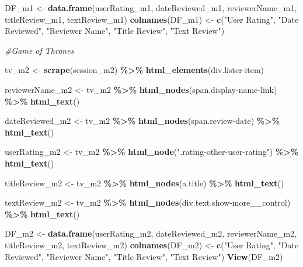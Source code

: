 \documentclass[
]{article}
\newenvironment{Shaded}{\begin{snugshade}}{\end{snugshade}}
\newcommand{\CommentTok}[1]{\textcolor[rgb]{0.56,0.35,0.01}{\textit{#1}}}
\newcommand{\FunctionTok}[1]{\textcolor[rgb]{0.13,0.29,0.53}{\textbf{#1}}}
\newcommand{\NormalTok}[1]{#1}
\newcommand{\OtherTok}[1]{\textcolor[rgb]{0.56,0.35,0.01}{#1}}
\newcommand{\SpecialCharTok}[1]{\textcolor[rgb]{0.81,0.36,0.00}{\textbf{#1}}}
\newcommand{\StringTok}[1]{\textcolor[rgb]{0.31,0.60,0.02}{#1}}
\begin{document}
\begin{Shaded}
\begin{Highlighting}[]
\NormalTok{DF\_m1 }\OtherTok{\textless{}{-}} \FunctionTok{data.frame}\NormalTok{(userRating\_m1, dateReviewed\_m1, reviewerName\_m1, titleReview\_m1, textReview\_m1)}
\FunctionTok{colnames}\NormalTok{(DF\_m1) }\OtherTok{\textless{}{-}} \FunctionTok{c}\NormalTok{(}\StringTok{"User Rating"}\NormalTok{, }\StringTok{"Date Reviewed"}\NormalTok{, }\StringTok{"Reviewer Name"}\NormalTok{, }\StringTok{"Title Review"}\NormalTok{, }\StringTok{"Text Review"}\NormalTok{)}


\CommentTok{\#Game of Thrones}

\NormalTok{tv\_m2 }\OtherTok{\textless{}{-}} \FunctionTok{scrape}\NormalTok{(session\_m2) }\SpecialCharTok{\%\textgreater{}\%} 
  \FunctionTok{html\_elements}\NormalTok{(}\StringTok{\textquotesingle{}div.lister{-}item\textquotesingle{}}\NormalTok{)}

\NormalTok{reviewerName\_m2 }\OtherTok{\textless{}{-}}\NormalTok{ tv\_m2 }\SpecialCharTok{\%\textgreater{}\%}
  \FunctionTok{html\_nodes}\NormalTok{(}\StringTok{\textquotesingle{}span.display{-}name{-}link\textquotesingle{}}\NormalTok{) }\SpecialCharTok{\%\textgreater{}\%}
  \FunctionTok{html\_text}\NormalTok{()}

\NormalTok{dateReviewed\_m2 }\OtherTok{\textless{}{-}}\NormalTok{ tv\_m2 }\SpecialCharTok{\%\textgreater{}\%}
  \FunctionTok{html\_nodes}\NormalTok{(}\StringTok{\textquotesingle{}span.review{-}date\textquotesingle{}}\NormalTok{) }\SpecialCharTok{\%\textgreater{}\%}
  \FunctionTok{html\_text}\NormalTok{()}

\NormalTok{userRating\_m2 }\OtherTok{\textless{}{-}}\NormalTok{ tv\_m2 }\SpecialCharTok{\%\textgreater{}\%} 
  \FunctionTok{html\_node}\NormalTok{(}\StringTok{".rating{-}other{-}user{-}rating"}\NormalTok{) }\SpecialCharTok{\%\textgreater{}\%} 
  \FunctionTok{html\_text}\NormalTok{()}

\NormalTok{titleReview\_m2 }\OtherTok{\textless{}{-}}\NormalTok{ tv\_m2 }\SpecialCharTok{\%\textgreater{}\%}
  \FunctionTok{html\_nodes}\NormalTok{(}\StringTok{\textquotesingle{}a.title\textquotesingle{}}\NormalTok{) }\SpecialCharTok{\%\textgreater{}\%}
  \FunctionTok{html\_text}\NormalTok{()}

\NormalTok{textReview\_m2 }\OtherTok{\textless{}{-}}\NormalTok{ tv\_m2 }\SpecialCharTok{\%\textgreater{}\%}
  \FunctionTok{html\_nodes}\NormalTok{(}\StringTok{\textquotesingle{}div.text.show{-}more\_\_control\textquotesingle{}}\NormalTok{) }\SpecialCharTok{\%\textgreater{}\%}
  \FunctionTok{html\_text}\NormalTok{()}


\NormalTok{DF\_m2 }\OtherTok{\textless{}{-}} \FunctionTok{data.frame}\NormalTok{(userRating\_m2, dateReviewed\_m2, reviewerName\_m2, titleReview\_m2, textReview\_m2)}
\FunctionTok{colnames}\NormalTok{(DF\_m2) }\OtherTok{\textless{}{-}} \FunctionTok{c}\NormalTok{(}\StringTok{"User Rating"}\NormalTok{, }\StringTok{"Date Reviewed"}\NormalTok{, }\StringTok{"Reviewer Name"}\NormalTok{, }\StringTok{"Title Review"}\NormalTok{, }\StringTok{"Text Review"}\NormalTok{)}
\FunctionTok{View}\NormalTok{(DF\_m2)}



\end{Highlighting}
\end{Shaded}
\end{document}
